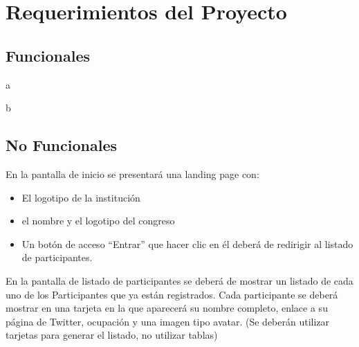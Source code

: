 \chapter{Requerimientos del Proyecto}

\setcounter{cRequerimientos}{0}
\newcommand{\IncReq}{\addtocounter{cRequerimientos}{1}}


\section{Funcionales}
\begin{list}{RF\_\IncReq\thecRequerimientos}{}
	\item a
	\item b
\end{list}

\section{No Funcionales}

\begin{list}{RNF\_\IncReq\thecRequerimientos}{}
	\item En la pantalla de inicio se presentará una landing page con:
	\begin{itemize}
		\item El logotipo de la institución
		\item el nombre y el logotipo del congreso
		\item Un botón de acceso ``Entrar'' que hacer clic en él deberá de redirigir al listado de participantes.
	\end{itemize}
	
	\item En la pantalla de listado de participantes se deberá de mostrar un listado de cada uno de los Participantes que ya están 
	registrados. Cada participante se deberá mostrar en una tarjeta en la que aparecerá su nombre completo, enlace a su página de Twitter, ocupación y una imagen tipo avatar.
	(Se deberán utilizar tarjetas para generar el listado, no utilizar tablas)
\end{list}